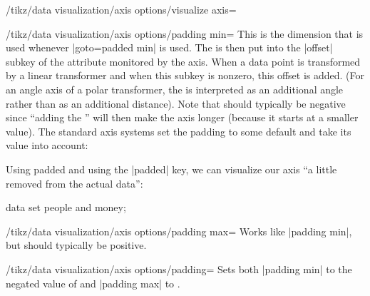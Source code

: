 \begin{key}{/tikz/data visualization/axis options/visualize axis=}
  \begin{key}{/tikz/data visualization/axis options/padding min=}
    This is the dimension that is used whenever |goto=padded min| is
    used. The  is then put into the |offset| subkey of
    the attribute monitored by the axis. When a data point is
    transformed by a linear transformer and when this subkey is
    nonzero, this offset is added. (For an angle axis of a polar
    transformer, the  is interpreted as an additional
    angle rather than as an additional distance). Note that
     should typically be negative since 
    ``adding the '' will then make the axis longer
    (because it starts at a smaller value). The standard
    axis systems set the padding to some default and take its value
    into account: 
\begin{codeexample}[width=8cm]
\end{codeexample}

  Using padded and using the |padded| key, we can visualize our axis
  ``a little removed from the actual data'':
\begin{codeexample}[]
\tikz \datavisualization [
    our system,
    x axis={attribute=time, length=3cm},
    left axis ={attribute=money},
    right axis={attribute=people},
    visualize as line/.list={people 1, people 2, money 1, money 2}]
  data set {people and money};  
\end{codeexample}  
  \end{key}

  \begin{key}{/tikz/data visualization/axis options/padding max=}
    Works like |padding min|, but  should typically be positive.
  \end{key}
  
  \begin{key}{/tikz/data visualization/axis options/padding=}
    Sets both |padding min| to the negated value of  and
    |padding max| to .
  \end{key}
\end{key}



